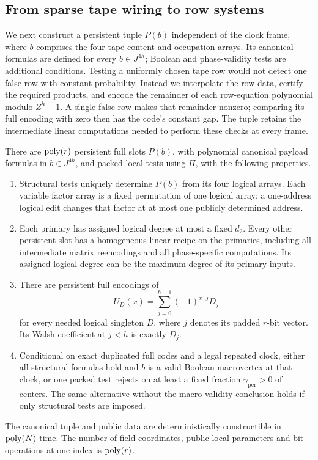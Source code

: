 \subsection{From sparse tape wiring to row systems}

We next construct a persistent tuple $P(b)$ independent of the clock
frame, where $b$ comprises the four tape-content and occupation arrays.
Its canonical formulas are defined for every $b\in J^{4h}$; Boolean
and phase-validity tests are additional conditions.
Testing a uniformly chosen tape row would not detect one false row with
constant probability. Instead we interpolate the row data, certify the
required products, and encode the remainder of each row-equation
polynomial modulo $Z^h-1$. A single false row makes that remainder
nonzero; comparing its full encoding with zero then has the code's
constant gap. The tuple retains the intermediate linear computations
needed to perform these checks at every frame.

\begin{lemma}\label{lem:outer-wiring}
There are $\operatorname{poly}(r)$ persistent full slots $P(b)$, with polynomial
canonical payload formulas in $b\in J^{4h}$, and packed local tests
using $\Pi$, with the following properties.
\begin{enumerate}[label=(\roman*)]
\item Structural tests uniquely determine $P(b)$ from its four logical
arrays.  Each variable factor array is a fixed permutation of one
logical array; a one-address logical edit changes that factor at at
most one publicly determined address.
\item Each primary has assigned logical degree at most a fixed $d_2$.
Every other persistent slot has a homogeneous linear recipe on the
primaries, including all intermediate matrix reencodings and all
phase-specific computations.  Its assigned logical degree can be
the maximum degree of its primary inputs.
\item There are persistent full encodings of
\begin{equation}\label{op:address-transform}
       U_D(x)=\sum_{j=0}^{h-1}(-1)^{x\cdot j}D_j
\end{equation}
for every needed logical singleton $D$, where $j$ denotes its padded
$r$-bit vector.  Its Walsh coefficient at $j<h$ is exactly $D_j$.
\item Conditional on exact duplicated full codes and a legal repeated
clock, either all structural formulas hold and $b$ is a valid
Boolean macrovertex at that clock, or one packed test rejects on
at least a fixed fraction $\gamma_{\mathrm{per}}>0$ of centers.
The same alternative without the macro-validity conclusion holds
if only structural tests are imposed.
\end{enumerate}
The canonical tuple and public data are deterministically constructible
in $\operatorname{poly}(N)$ time.  The number of field coordinates, public local
parameters and bit operations at one index is $\operatorname{poly}(r)$.
\end{lemma}

